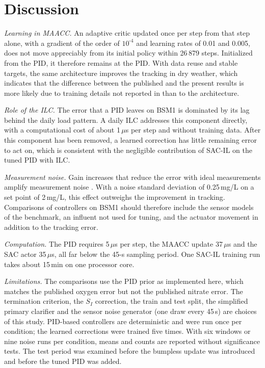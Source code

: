 \documentclass[journal]{IEEEtran}
\newcommand{\hy}{\text{-}}
\begin{document}
\section{Discussion}
\label{sec:disc}

\emph{Learning in MAACC.} An adaptive critic updated once per step from that
step alone, with a gradient of the order of $10^{\hy4}$ and learning rates of
0.01 and 0.005, does not move appreciably from its initial policy within
26\,879 steps. Initialized from the PID, it therefore remains at the PID.
With data reuse and stable targets, the same architecture improves the
tracking in dry weather, which indicates that the difference between the
published and the present results is more likely due to training details
not reported in \cite{wang2026maacc} than to the architecture.

\emph{Role of the ILC.} The error that a PID leaves on BSM1 is dominated by
its lag behind the daily load pattern. A daily ILC addresses this component
directly, with a computational cost of about 1\,$\mu$s per step and without
training data. After this component has been removed, a learned correction
has little remaining error to act on, which is consistent with the
negligible contribution of SAC-IL on the tuned PID with ILC.

\emph{Measurement noise.} Gain increases that reduce the error with ideal
measurements amplify measurement noise \cite{astrom2006pid}. With a noise
standard deviation of 0.25\,mg/L on a set point of 2\,mg/L, this effect
outweighs the improvement in tracking. Comparisons of controllers on BSM1
should therefore include the sensor models of the benchmark, an influent
not used for tuning, and the actuator movement in addition to the tracking
error.

\emph{Computation.} The PID requires 5\,$\mu$s per step, the MAACC update
37\,$\mu$s and the SAC actor 35\,$\mu$s, all far below the 45-s sampling
period. One SAC-IL training run takes about 15\,min on one processor core.

\emph{Limitations.} The comparisons use the PID prior as implemented here,
which matches the published oxygen error but not the published nitrate
error. The termination criterion, the $S_I$ correction, the train and test
split, the simplified primary clarifier and the sensor noise generator (one
draw every 45\,s) are choices of this study. PID-based controllers are
deterministic and were run once per condition; the learned corrections were
trained five times. With six windows or nine noise runs per condition,
means and counts are reported without significance tests. The test period
was examined before the bumpless update was introduced and before the tuned
PID was added.
\end{document}
